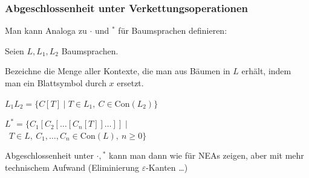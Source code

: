     \begin{frame}
      \frametitle{Abgeschlossenheit unter Verkettungsoperationen}


      \par %
      Man kann
      Analoga zu $\cdot$ und ${}^*$ für Baumsprachen definieren:

      \par\bigskip
      Seien $L,L_1,L_2$ Baumsprachen.

      \par\medskip
      Bezeichne  die Menge aller Kontexte, die man aus Bäumen in $L$ erhält, indem man ein Blattsymbol durch $x$ ersetzt.

      \begin{block}{}
        \begin{Itemize}
          \item
            $L_1L_2 = \{C[T] \mid T \in L_1,~ C \in \text{Con}(L_2)\}$
            \par\smallskip
          \item
            $L^* = \{C_1[C_2[\dots[C_n[T]]\dots]] \mid $\\[2pt]
            ~\hspace*{\fill}$T \in L,~ C_1,\dots,C_n \in \text{Con}(L),~ n \geqslant 0\}$
        \end{Itemize}
      \end{block}

      \par\bigskip
      Abgeschlossenheit unter $\cdot,{}^*$ kann man dann wie für NEAs zeigen, aber mit mehr technischem Aufwand (Eliminierung $\varepsilon$-Kanten \dots)


    \end{frame}


